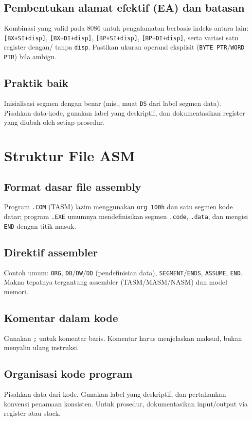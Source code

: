 \subsection{Pembentukan alamat efektif (EA) dan batasan}
Kombinasi yang valid pada 8086 untuk pengalamatan berbasis indeks antara lain: \texttt{[BX+SI+disp]}, \texttt{[BX+DI+disp]}, \texttt{[BP+SI+disp]}, \texttt{[BP+DI+disp]}, serta variasi satu register dengan/ tanpa \texttt{disp}. Pastikan ukuran operand eksplisit (\texttt{BYTE PTR}/\texttt{WORD PTR}) bila ambigu. \cite{intel2019manual32}

\subsection{Praktik baik}
Inisialisasi segmen dengan benar (mis., muat \texttt{DS} dari label segmen data). Pisahkan data-kode, gunakan label yang deskriptif, dan dokumentasikan register yang diubah oleh setiap prosedur.

\section{Struktur File ASM}
\subsection{Format dasar file assembly}
Program \texttt{.COM} (TASM) lazim menggunakan \texttt{org 100h} dan satu segmen kode datar; program \texttt{.EXE} umumnya mendefinisikan segmen \texttt{.code}, \texttt{.data}, dan mengisi \texttt{END} dengan titik masuk.

\subsection{Direktif assembler}
Contoh umum: \texttt{ORG}, \texttt{DB}/\texttt{DW}/\texttt{DD} (pendefinisian data), \texttt{SEGMENT}/\texttt{ENDS}, \texttt{ASSUME}, \texttt{END}. Makna tepatnya tergantung assembler (TASM/MASM/NASM) dan model memori.

\subsection{Komentar dalam kode}
Gunakan \texttt{;} untuk komentar baris. Komentar harus menjelaskan maksud, bukan menyalin ulang instruksi.

\subsection{Organisasi kode program}
Pisahkan data dari kode. Gunakan label yang deskriptif, dan pertahankan konvensi penamaan konsisten. Untuk prosedur, dokumentasikan input/output via register atau stack.

